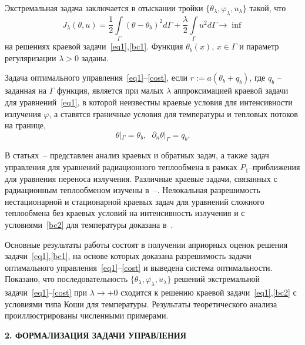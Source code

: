\documentclass[12pt]{article}
\begin{document}
    Экстремальная задача заключается в отыскании тройки $\{\theta_\lambda,\varphi_\lambda,u_\lambda\}$
    такой, что
    \begin{equation}
        \label{cost}
        J_\lambda(\theta, u) = \frac{1}{2}\int\limits_\Gamma (\theta - \theta_b)^2d\Gamma
        + \frac{\lambda}{2}\int\limits_\Gamma u^2d\Gamma \rightarrow\inf
    \end{equation}
    на решениях краевой задачи~\eqref{eq1},\eqref{bc1}.
    Функция $\theta_b(x),\, x\in\Gamma$  и параметр регуляризации $\lambda>0$ заданы.

    Задача оптимального управления~\eqref{eq1}--\eqref{cost}, если
    $r:=a(\theta_b+q_b)$, где $q_b$ -- заданная на $\Gamma$ функция,
    является при малых $\lambda$ аппроксимацией краевой задачи для уравнений~\eqref{eq1}, в которой
    неизвестны краевые условия для интенсивности излучения $\varphi$, а ставятся
    граничные условия для температуры и тепловых потоков на границе,
    \begin{equation}
        \label{bc2}
        \theta|_\Gamma = \theta_b,\;\;
        \partial_n\theta|_\Gamma = q_b.
    \end{equation}


    В статьях~\cite{Pinnau07}--\cite{JMAA-19} представлен анализ
    краевых и обратных задач, а также задач управления
    для уравнений радиационного теплообмена
    в рамках $P_1$--приближения для уравнения
    переноса излучения.
    Различные краевые задачи, связанных с радиационным теплообменом
    изучены в~\cite{AmosA05}--\cite{Amosov18}.
    Нелокальная разрешимость
    нестационарной и стационарной краевых задач для уравнений сложного теплообмена
    без краевых условий на интенсивность излучения и
    с условиями~\eqref{bc2} для температуры доказана в~\cite{CNSNS19,CMMP20}.


    Основные результаты работы состоят в получении априорных оценок
    решения задачи~\eqref{eq1},\eqref{bc1}, на основе которых
    доказана разрешимость задачи оптимального управления~\eqref{eq1}--\eqref{cost} и выведена система оптимальности.
    Показано, что
    последовательность $\{\theta_\lambda,\varphi_\lambda,u_\lambda\}$ решений
    экстремальной задачи~\eqref{eq1}--\eqref{cost} при $\lambda\to +0$
    сходится к решению краевой задачи~\eqref{eq1},\eqref{bc2} с условиями типа Коши для температуры.
    Результаты теоретического анализа проиллюстрированы численными примерами.


    \begin{center}
        \textbf{2. ФОРМАЛИЗАЦИЯ ЗАДАЧИ УПРАВЛЕНИЯ}
    \end{center}
\end{document}
